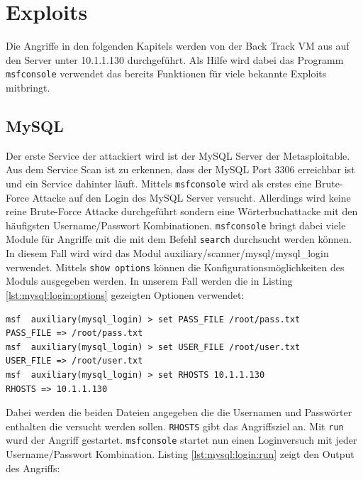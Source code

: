 \documentclass[a4paper,12pt]{article} %
\begin{document}
\section{Exploits}
Die Angriffe in den folgenden Kapitels werden von der Back Track VM aus auf den Server unter 10.1.1.130 durchgeführt. Als Hilfe wird dabei das Programm \verb!msfconsole! verwendet das bereits Funktionen für viele bekannte Exploits mitbringt.

\subsection{MySQL}
Der erste Service der attackiert wird ist der MySQL Server der Metasploitable. Aus dem Service Scan ist zu erkennen, dass der MySQL Port 3306 erreichbar ist und ein Service dahinter läuft. Mittels \verb!msfconsole! wird als erstes eine Brute-Force Attacke auf den Login des MySQL Server versucht. Allerdings wird keine reine Brute-Force Attacke durchgeführt sondern eine Wörterbuchattacke mit den häufigsten Username/Passwort Kombinationen. \verb!msfconsole! bringt dabei viele Module für Angriffe mit die mit dem Befehl \verb!search! durchsucht werden können. In diesem Fall wird wird das Modul auxiliary/scanner/mysql/mysql\_login verwendet. Mittels \verb!show options! können die Konfigurationsmöglichkeiten des Moduls ausgegeben werden. In unserem Fall werden die in Listing \ref{lst:mysql:login:options} gezeigten Optionen verwendet:

\begin{lstlisting}[style=code,caption={Konfiguration des MySQL Moduls},label=lst:mysql:login:options]
msf  auxiliary(mysql_login) > set PASS_FILE /root/pass.txt
PASS_FILE => /root/pass.txt
msf  auxiliary(mysql_login) > set USER_FILE /root/user.txt 
USER_FILE => /root/user.txt
msf  auxiliary(mysql_login) > set RHOSTS 10.1.1.130
RHOSTS => 10.1.1.130
\end{lstlisting}
Dabei werden die beiden Dateien angegeben die die Usernamen und Passwörter enthalten die versucht werden sollen. \verb!RHOSTS! gibt das Angriffsziel an. Mit \verb!run! wurd der Angriff gestartet. \verb!msfconsole! startet nun einen Loginversuch mit jeder Username/Passwort Kombination. Listing \ref{lst:mysql:login:run} zeigt den Output des Angriffs:
\end{document}
